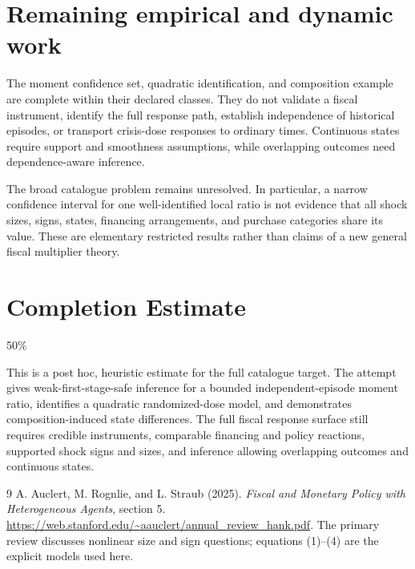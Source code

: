 \documentclass[11pt,a4paper]{article}
\begin{document}
\section{Remaining empirical and dynamic work}
The moment confidence set, quadratic identification, and composition example are complete within their declared classes. They do not validate a fiscal instrument, identify the full response path, establish independence of historical episodes, or transport crisis-dose responses to ordinary times. Continuous states require support and smoothness assumptions, while overlapping outcomes need dependence-aware inference.

The broad catalogue problem remains unresolved. In particular, a narrow confidence interval for one well-identified local ratio is not evidence that all shock sizes, signs, states, financing arrangements, and purchase categories share its value. These are elementary restricted results rather than claims of a new general fiscal multiplier theory.

\section{Completion Estimate}
50\%

This is a post hoc, heuristic estimate for the full catalogue target.
The attempt gives weak-first-stage-safe inference for a bounded independent-episode moment ratio, identifies a quadratic randomized-dose model, and demonstrates composition-induced state differences. The full fiscal response surface still requires credible instruments, comparable financing and policy reactions, supported shock signs and sizes, and inference allowing overlapping outcomes and continuous states.

\begin{thebibliography}{9}
 A. Auclert, M. Rognlie, and L. Straub (2025).
\emph{Fiscal and Monetary Policy with Heterogeneous Agents}, section 5.
\url{https://web.stanford.edu/~aauclert/annual_review_hank.pdf}.
The primary review discusses nonlinear size and sign questions; equations (1)--(4) are the explicit models used here.
\end{thebibliography}
\end{document}
